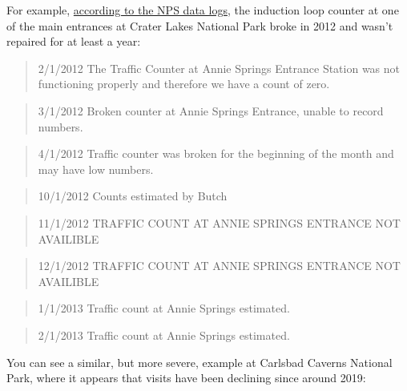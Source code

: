 \documentclass[
  letterpaper,
  DIV=11,
  numbers=noendperiod]{scrartcl}
\begin{document}
For example,
\href{https://irma.nps.gov/Stats/SSRSReports/Park\%20Specific\%20Reports/Monthly\%20Visitation\%20Comments\%20By\%20Park?Park=CRLA}{according
to the NPS data logs}, the induction loop counter at one of the main
entrances at Crater Lakes National Park broke in 2012 and wasn't
repaired for at least a year:

\begin{quote}
2/1/2012 \textbar{} The Traffic Counter at Annie Springs Entrance
Station was not functioning properly and therefore we have a count of
zero.
\end{quote}

\begin{quote}
3/1/2012 \textbar{} Broken counter at Annie Springs Entrance, unable to
record numbers.
\end{quote}

\begin{quote}
4/1/2012 \textbar{} Traffic counter was broken for the beginning of the
month and may have low numbers.
\end{quote}

\begin{quote}
10/1/2012 \textbar{} Counts estimated by Butch
\end{quote}

\begin{quote}
11/1/2012 \textbar{} TRAFFIC COUNT AT ANNIE SPRINGS ENTRANCE NOT
AVAILIBLE
\end{quote}

\begin{quote}
12/1/2012 \textbar{} TRAFFIC COUNT AT ANNIE SPRINGS ENTRANCE NOT
AVAILIBLE
\end{quote}

\begin{quote}
1/1/2013 \textbar{} Traffic count at Annie Springs estimated.
\end{quote}

\begin{quote}
2/1/2013 \textbar{} Traffic count at Annie Springs estimated.
\end{quote}

You can see a similar, but more severe, example at Carlsbad Caverns
National Park, where it appears that visits have been declining since
around 2019:
\end{document}
